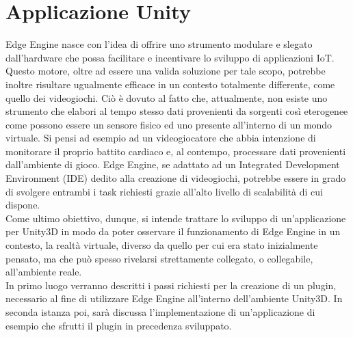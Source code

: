 \section{Applicazione Unity}
Edge Engine nasce con l’idea di offrire uno strumento modulare e slegato dall'hardware che possa facilitare e incentivare lo sviluppo di applicazioni IoT. Questo motore, oltre ad essere una valida soluzione per tale scopo, potrebbe inoltre risultare ugualmente efficace in un contesto totalmente differente, come quello dei videogiochi. Ciò è dovuto al fatto che, attualmente, non esiste uno strumento che elabori al tempo stesso dati provenienti da sorgenti così eterogenee come possono essere un sensore fisico ed uno presente all'interno di un mondo virtuale. Si pensi ad esempio ad un videogiocatore che abbia intenzione di monitorare il proprio battito cardiaco e, al contempo, processare dati provenienti dall’ambiente di gioco. Edge Engine, se adattato ad un Integrated Development Environment (IDE) dedito alla creazione di videogiochi, potrebbe essere in grado di svolgere entrambi i task richiesti grazie all’alto livello di scalabilità di cui dispone.\\
Come ultimo obiettivo, dunque, si intende trattare lo sviluppo di un’applicazione per Unity3D in modo da poter osservare il funzionamento di Edge Engine in un contesto, la realtà virtuale, diverso da quello per cui era stato inizialmente pensato, ma che può spesso rivelarsi strettamente collegato, o collegabile, all'ambiente reale.\\
In primo luogo verranno descritti i passi richiesti per la creazione di un plugin, necessario al fine di utilizzare Edge Engine all'interno dell'ambiente Unity3D. In seconda istanza poi, sarà discussa l'implementazione di un'applicazione di esempio che sfrutti il plugin in precedenza sviluppato.
